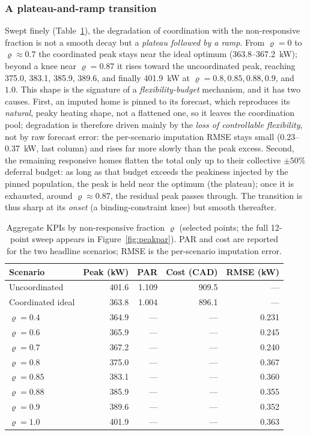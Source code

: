 \subsubsection{A plateau-and-ramp transition}
Swept finely (Table~\ref{tab:agg}), the degradation of coordination with the
non-responsive fraction is not a smooth decay but a \emph{plateau followed by a
ramp}. From $\varrho = 0$ to $\varrho \approx 0.7$ the coordinated peak stays
near the ideal optimum (363.8--367.2~kW); beyond a knee near $\varrho = 0.87$ it
rises toward the uncoordinated peak, reaching 375.0, 383.1, 385.9, 389.6, and
finally 401.9~kW at $\varrho = 0.8, 0.85, 0.88, 0.9$, and $1.0$. This shape is the
signature of a \emph{flexibility-budget} mechanism, and it has two causes. First,
an imputed home is pinned to its forecast, which reproduces its \emph{natural},
peaky heating shape, not a flattened one, so it leaves the coordination pool;
degradation is therefore driven mainly by the \emph{loss of controllable
flexibility}, not by raw forecast error: the per-scenario imputation RMSE stays
small (0.23--0.37~kW, last column) and rises far more slowly than the peak excess. Second, the remaining responsive homes flatten the total only up to
their collective $\pm 50\%$ deferral budget: as long as that budget exceeds the
peakiness injected by the pinned population, the peak is held near the
optimum (the plateau); once it is exhausted, around $\varrho \approx 0.87$,
the residual peak passes through. The transition is thus sharp at its
\emph{onset} (a binding-constraint knee) but smooth thereafter.

\begin{table}[t]
\centering
\caption{Aggregate KPIs by non-responsive fraction $\varrho$ (selected points;
the full 12-point sweep appears in Figure~\ref{fig:peakpar}). PAR and cost are
reported for the two headline scenarios; RMSE is the per-scenario imputation
error.}
\label{tab:agg}
\begin{tabular}{@{}lrrrr@{}}
\toprule
Scenario & Peak (kW) & PAR & Cost (CAD) & RMSE (kW) \\
\midrule
Uncoordinated      & 401.6 & 1.109 & 909.5 & ---   \\
Coordinated ideal  & 363.8 & 1.004 & 896.1 & ---   \\
$\varrho{=}0.4$  & 364.9 & ---   & ---   & 0.231 \\
$\varrho{=}0.6$  & 365.9 & ---   & ---   & 0.245 \\
$\varrho{=}0.7$  & 367.2 & ---   & ---   & 0.240 \\
$\varrho{=}0.8$  & 375.0 & ---   & ---   & 0.367 \\
$\varrho{=}0.85$ & 383.1 & ---   & ---   & 0.360 \\
$\varrho{=}0.88$ & 385.9 & ---   & ---   & 0.355 \\
$\varrho{=}0.9$  & 389.6 & ---   & ---   & 0.352 \\
$\varrho{=}1.0$  & 401.9 & ---   & ---   & 0.363 \\
\bottomrule
\end{tabular}
\end{table}

